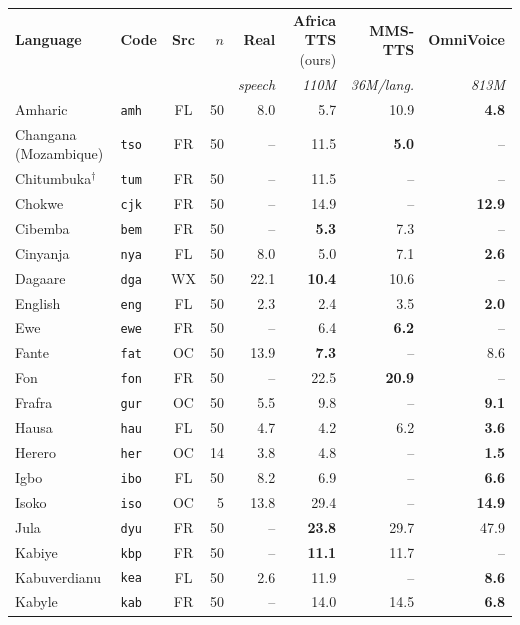 \begin{table}[h!]
\centering
\small
\setlength{\tabcolsep}{4pt}
\begin{tabular}{llcrrrrr}
\toprule
\textbf{Language} & \textbf{Code} & \textbf{Src} & \textbf{$n$} & \textbf{Real} & \textbf{Africa TTS} (ours) & \textbf{MMS-TTS} & \textbf{OmniVoice} \\
 &  &  &  & \textit{speech} & \textit{110M} & \textit{36M/lang.} & \textit{813M} \\
\midrule
Amharic & \texttt{amh} & FL & 50 & 8.0 & 5.7 & 10.9 & \textbf{4.8} \\
Changana (Mozambique) & \texttt{tso} & FR & 50 & -- & 11.5 & \textbf{5.0} & -- \\
Chitumbuka$^\dagger$ & \texttt{tum} & FR & 50 & -- & 11.5 & -- & -- \\
Chokwe & \texttt{cjk} & FR & 50 & -- & 14.9 & -- & \textbf{12.9} \\
Cibemba & \texttt{bem} & FR & 50 & -- & \textbf{5.3} & 7.3 & -- \\
Cinyanja & \texttt{nya} & FL & 50 & 8.0 & 5.0 & 7.1 & \textbf{2.6} \\
Dagaare & \texttt{dga} & WX & 50 & 22.1 & \textbf{10.4} & 10.6 & -- \\
English & \texttt{eng} & FL & 50 & 2.3 & 2.4 & 3.5 & \textbf{2.0} \\
Ewe & \texttt{ewe} & FR & 50 & -- & 6.4 & \textbf{6.2} & -- \\
Fante & \texttt{fat} & OC & 50 & 13.9 & \textbf{7.3} & -- & 8.6 \\
Fon & \texttt{fon} & FR & 50 & -- & 22.5 & \textbf{20.9} & -- \\
Frafra & \texttt{gur} & OC & 50 & 5.5 & 9.8 & -- & \textbf{9.1} \\
Hausa & \texttt{hau} & FL & 50 & 4.7 & 4.2 & 6.2 & \textbf{3.6} \\
Herero & \texttt{her} & OC & 14 & 3.8 & 4.8 & -- & \textbf{1.5} \\
Igbo & \texttt{ibo} & FL & 50 & 8.2 & 6.9 & -- & \textbf{6.6} \\
Isoko & \texttt{iso} & OC & 5 & 13.8 & 29.4 & -- & \textbf{14.9} \\
Jula & \texttt{dyu} & FR & 50 & -- & \textbf{23.8} & 29.7 & 47.9 \\
Kabiye & \texttt{kbp} & FR & 50 & -- & \textbf{11.1} & 11.7 & -- \\
Kabuverdianu & \texttt{kea} & FL & 50 & 2.6 & 11.9 & -- & \textbf{8.6} \\
Kabyle & \texttt{kab} & FR & 50 & -- & 14.0 & 14.5 & \textbf{6.8} \\

\end{tabular}
\end{table}

